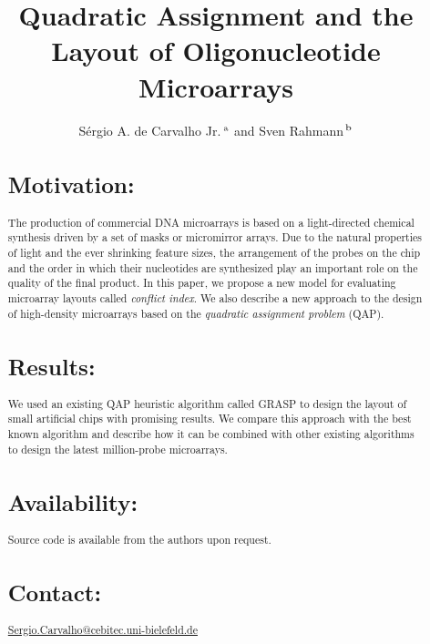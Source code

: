 \documentclass{bioinfo}
\begin{document}

\title[Quadratic assignment and microarrays]{Quadratic Assignment and the Layout of Oligonucleotide Microarrays}
\author[S.A.de Carvalho Jr. and S.Rahmann]{S\'ergio A. de Carvalho Jr.\,$^{\rm a}$ and Sven Rahmann\,$^{\rm b}$}
\address{$^{\rm a}$Graduiertenkolleg Bioinformatik, Bielefeld University, Germany,\\$^{\rm b}$Algorithms and Statistics for Systems Biology, Genome Informatics, Bielefeld University, Germany.}
\maketitle

\begin{abstract}

\section{Motivation:}
The production of commercial DNA microarrays is based on a light-directed chemical synthesis driven by a set of masks or micromirror arrays. Due to the natural properties of light and the ever shrinking feature sizes, the arrangement of the probes on the chip and the order in which their nucleotides are synthesized play an important role on the quality of the final product. In this paper, we propose a new model for evaluating microarray layouts called \emph{conflict index}. We also describe a new approach to the design of high-density microarrays based on the \emph{quadratic assignment problem} (QAP).
\section{Results:}
We used an existing QAP heuristic algorithm called GRASP to design the layout of small artificial chips with promising results. We compare this approach with the best known algorithm and describe how it can be combined with other existing algorithms to design the latest million-probe microarrays.
\section{Availability:}
Source code is available from the authors upon request.
\section{Contact:} \href{Sergio.Carvalho@cebitec.uni-bielefeld.de}{Sergio.Carvalho@cebitec.uni-bielefeld.de}
\end{abstract}
\end{document}
